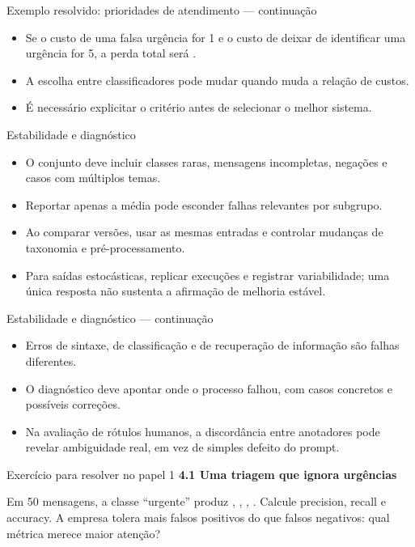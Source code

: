 \documentclass[10pt,aspectratio=169]{beamer}
\begin{document}
\begin{frame}[t]{Exemplo resolvido: prioridades de atendimento — continuação}
\small
\begin{itemize}
\item Se o custo de uma falsa urgência for 1 e o custo de deixar de identificar uma urgência for 5, a perda total será .
\item A escolha entre classificadores pode mudar quando muda a relação de custos.
\item É necessário explicitar o critério antes de selecionar o melhor sistema.
\end{itemize}
\end{frame}

\begin{frame}[t]{Estabilidade e diagnóstico}
\small
\begin{itemize}
\item O conjunto deve incluir classes raras, mensagens incompletas, negações e casos com múltiplos temas.
\item Reportar apenas a média pode esconder falhas relevantes por subgrupo.
\item Ao comparar versões, usar as mesmas entradas e controlar mudanças de taxonomia e pré-processamento.
\item Para saídas estocásticas, replicar execuções e registrar variabilidade; uma única resposta não sustenta a afirmação de melhoria estável.
\end{itemize}
\end{frame}

\begin{frame}[t]{Estabilidade e diagnóstico — continuação}
\small
\begin{itemize}
\item Erros de sintaxe, de classificação e de recuperação de informação são falhas diferentes.
\item O diagnóstico deve apontar onde o processo falhou, com casos concretos e possíveis correções.
\item Na avaliação de rótulos humanos, a discordância entre anotadores pode revelar ambiguidade real, em vez de simples defeito do prompt.
\end{itemize}
\end{frame}

\begin{frame}[t]{Exercício para resolver no papel 1}
\small
\small\textbf{4.1 Uma triagem que ignora urgências}\par\vspace{4mm}Em 50 mensagens, a classe ``urgente'' produz , , , . Calcule precision, recall e accuracy. A empresa tolera mais falsos positivos do que falsos negativos: qual métrica merece maior atenção?
\end{frame}
\end{document}
